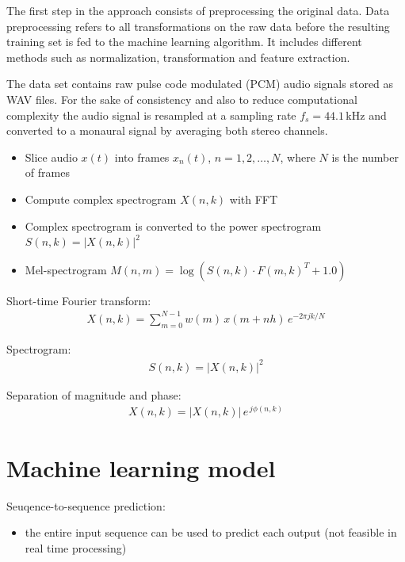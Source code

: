 \documentclass{article}
\begin{document}
The first step in the approach consists of preprocessing the original data. Data preprocessing refers to all transformations on the raw data before the resulting training set is fed to the machine learning algorithm. It includes different methods such as normalization, transformation and feature extraction. 

The data set contains raw pulse code modulated (PCM) audio signals stored as WAV files. For the sake of consistency and also to reduce computational complexity the audio signal is resampled at a sampling rate $f_s = 44.1 \,\text{kHz}$ and converted to a monaural signal by averaging both stereo channels. 


\begin{itemize}
\item Slice audio $x(t)$ into frames $x_n(t)$, $n = 1, 2,\dots, N$, where $N$ is the number of frames
\item Compute complex spectrogram $X(n,k)$ with FFT 
\item Complex spectrogram is converted to the power spectrogram $S(n, k) = |X(n, k)|^2$
\item Mel-spectrogram $M(n,m) = \log \left( S(n,k) \cdot F(m,k)^T + 1.0 \right)$
\end{itemize}
\vspace{1em}

Short-time Fourier transform:
\begin{align}
X(n,k) = \sum_{m = 0}^{N-1} w(m) \, x(m + n  h) \, e^{-2 \pi j  k /N}
\end{align} 

Spectrogram: 
\begin{align}
S(n,k) = |X(n,k)|^2
\end{align} 

Separation of magnitude and phase:
\begin{align} 
X(n,k) = |X(n,k)| \, e^{\, j \phi(n,k)}
\end{align} 



\section{Machine learning model}

Seuqence-to-sequence prediction:
\begin{itemize}
\item the entire input sequence can be used to predict each output (not feasible in real time processing)
\end{itemize}
\end{document}
